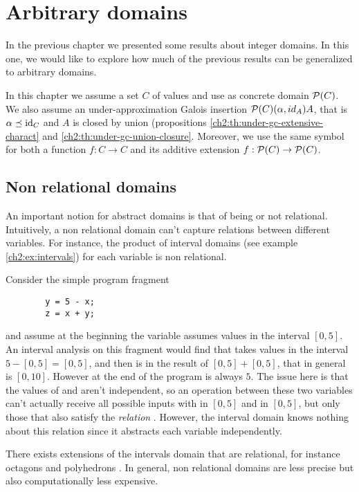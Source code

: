 \chapter{Arbitrary domains}
In the previous chapter we presented some results about integer domains. In this one, we would like to explore how much of the previous results can be generalized to arbitrary domains.

In this chapter we assume a set $C$ of values and use as concrete domain $\mathcal{P}(C)$. We also assume an under-approximation Galois insertion $\mathcal{P}(C) (\alpha, id_A) A$, that is $\alpha \preceq \text{id}_C$ and $A$ is closed by union (propositions \ref{ch2:th:under-gc-extensive-charact} and \ref{ch2:th:under-gc-union-closure}.
Moreover, we use the same symbol for both a function $f : C \rightarrow C$ and its additive extension $f: \mathcal{P}(C) \rightarrow \mathcal{P}(C)$.

\section{Non relational domains}
An important notion for abstract domains is that of being or not relational. Intuitively, a non relational domain can't capture relations between different variables. For instance, the product of interval domains (see example \ref{ch2:ex:intervals}) for each variable is non relational.
\begin{example}
	Consider the simple program fragment
	\begin{verbatim}
		y = 5 - x;
		z = x + y;
	\end{verbatim}
	and assume at the beginning the variable  assumes values in the interval $[0, 5]$. An interval analysis on this fragment would find that  takes values in the interval $5 - [0, 5] = [0, 5]$, and then  is in the result of $[0, 5] + [0, 5]$, that in general is $[0, 10]$. However at the end of the program  is always $5$.
	The issue here is that the values of  and  aren't independent, so an operation between these two variables can't actually receive all possible inputs with  in $[0, 5]$ and  in $[0, 5]$, but only those that also satisfy the \textit{relation} . However, the interval domain knows nothing about this relation since it abstracts each variable independently.
\end{example}
There exists extensions of the intervals domain that are relational, for instance octagons \cite{mine-octagons} and polyhedrons \cite{cousot-polyhedrons}. In general, non relational domains are less precise but also computationally less expensive.

